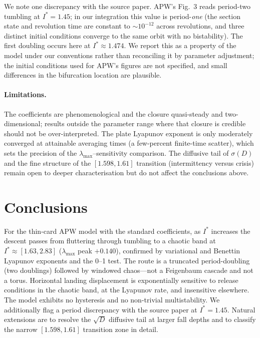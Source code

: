 \documentclass[11pt]{article}
\newcommand{\Is}{I^{*}}          %
\newcommand{\lmax}{\lambda_{\max}}
\begin{document}
We note one discrepancy with the source paper. APW's Fig.~3 reads period-two tumbling at $\Is=1.45$;
in our integration this value is period-\emph{one} (the section state and revolution time are constant
to $\sim10^{-12}$ across revolutions, and three distinct initial conditions converge to the same orbit
with no bistability). The first doubling occurs here at $\Is\approx1.474$. We report this as a
property of the model under our conventions rather than reconciling it by parameter adjustment; the
initial conditions used for APW's figures are not specified, and small differences in the bifurcation
location are plausible.

\paragraph{Limitations.} The coefficients are phenomenological and the closure quasi-steady and
two-dimensional; results outside the parameter range where that closure is credible should not be
over-interpreted. The plate Lyapunov exponent is only moderately converged at attainable averaging
times (a few-percent finite-time scatter), which sets the precision of the $\lmax$--sensitivity
comparison. The diffusive tail of $\sigma(D)$ and the fine structure of the $[1.598,1.61]$ transition
(intermittency versus crisis) remain open to deeper characterisation but do not affect the conclusions
above.

\section{Conclusions}\label{sec:conclusions}

For the thin-card APW model with the standard coefficients, as $\Is$ increases the descent passes from
fluttering through tumbling to a chaotic band at $\Is\approx[1.63,2.83]$ ($\lmax$ peak $+0.140$),
confirmed by variational and Benettin Lyapunov exponents and the 0--1 test. The route is a truncated
period-doubling (two doublings) followed by windowed chaos---not a Feigenbaum cascade and not a torus.
Horizontal landing displacement is exponentially sensitive to release conditions in the chaotic band,
at the Lyapunov rate, and insensitive elsewhere. The model exhibits no hysteresis and no non-trivial
multistability. We additionally flag a period discrepancy with the source paper at $\Is=1.45$. Natural
extensions are to resolve the $\sqrt{D}$ diffusive tail at larger fall depths and to classify the
narrow $[1.598,1.61]$ transition zone in detail.
\end{document}
